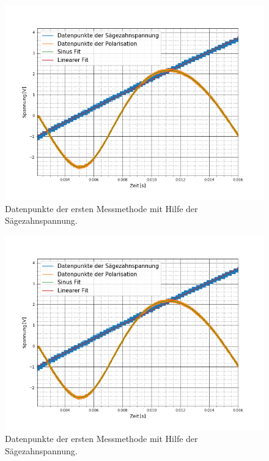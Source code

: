 \begin{figure}[ht]
	\includegraphics[scale=0.5]{Bild/V1_7}
	\centering
	\caption[Plot zu Versuchsteil 1 Nr.7]{Datenpunkte der ersten Messmethode mit Hilfe der Sägezahnspannung.}
\end{figure}
\begin{figure}[ht]
	\includegraphics[scale=0.5]{Bild/V1_8}
	\centering
	\caption[Plot zu Versuchsteil 1 Nr.8]{Datenpunkte der ersten Messmethode mit Hilfe der Sägezahnspannung.}
\end{figure}
